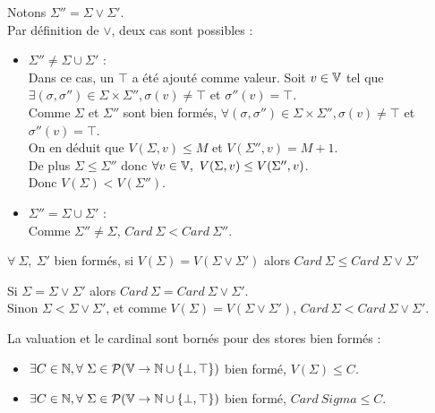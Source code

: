 \begin{pr}
Notons $\Sigma''=\Sigma\vee\Sigma'$.\\
Par définition de $\vee$, deux cas sont possibles :
\begin{itemize}
 \item $\Sigma''\neq\Sigma\cup\Sigma'$ :\\
       Dans ce cas, un $\top$ a été ajouté comme valeur. Soit $v\in\mathbb V$ tel que $\exists (\sigma,\sigma'')\in\Sigma\times\Sigma'', \sigma(v)\neq\top$ et $\sigma''(v)=\top$.\\
       Comme $\Sigma$ et $\Sigma''$ sont bien formés, $\forall (\sigma,\sigma'')\in\Sigma\times\Sigma'', \sigma(v)\neq\top$ et $\sigma''(v)=\top$.\\
       On en déduit que $V(\Sigma,v)\leq M$ et $V(\Sigma'',v)=M+1$.\\
       De plus $\Sigma\leq \Sigma''$ donc $\forall v\in\mathbb V,\ V(\Sigma,v)\leq V(\Sigma'',v)$.\\
       Donc $V(\Sigma)<V(\Sigma'')$.
 \item $\Sigma''=\Sigma\cup\Sigma'$ :\\
       Comme $\Sigma''\neq\Sigma$, $Card\ \Sigma<Card\ \Sigma''$.
\end{itemize}

\end{pr}

\begin{cor}
\label{corCard}
 $\forall\ \Sigma,\ \Sigma'$ bien formés, si $V(\Sigma) = V(\Sigma\vee\Sigma')$ alors $Card\ \Sigma \leq Card\ \Sigma\vee\Sigma'$ 
\end{cor}
\begin{pr}
 Si $\Sigma=\Sigma\vee\Sigma'$ alors $Card\ \Sigma = Card\ \Sigma\vee\Sigma'$.\\
 Sinon $\Sigma<\Sigma\vee\Sigma'$, et comme $V(\Sigma) = V(\Sigma\vee\Sigma')$, $Card\ \Sigma < Card\ \Sigma\vee\Sigma'$.
\end{pr}

\begin{prop}
 La valuation et le cardinal sont bornés pour des stores bien formés :
 \begin{itemize}
  \item $\exists C\in\BN, \forall\ \Sigma\in\TTrs$ bien formé, $V(\Sigma)\leq C$.
  \item $\exists C\in\BN, \forall\ \Sigma\in\TTrs$ bien formé, $Card\ Sigma\leq C$.
 \end{itemize}
\end{prop}

